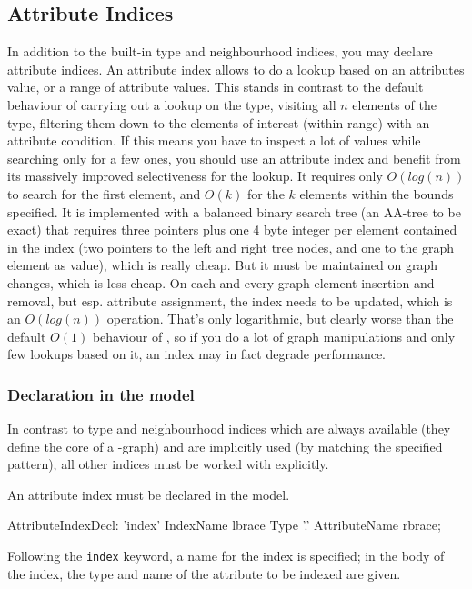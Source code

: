 \subsection{Attribute Indices}
In addition to the built-in type and neighbourhood indices, you may declare attribute indices.
An attribute index allows to do a lookup based on an attributes value, or a range of attribute values.
This stands in contrast to the default behaviour of carrying out a lookup on the type, visiting all $n$ elements of the type, filtering them down to the elements of interest (within range) with an attribute condition.
If this means you have to inspect a lot of values while searching only for a few ones, you should use an attribute index and benefit from its massively improved selectiveness for the lookup.
It requires only $O(log(n))$ to search for the first element, and $O(k)$ for the $k$ elements within the bounds specified.
It is implemented with a balanced binary search tree (an AA-tree\cite{Andersson93balancedsearch} to be exact) that requires three pointers plus one 4 byte integer per element contained in the index (two pointers to the left and right tree nodes, and one to the graph element as value), which is really cheap.
But it must be maintained on graph changes, which is less cheap.
On each and every graph element insertion and removal, but esp. attribute assignment, the index needs to be updated, which is an $O(log(n))$ operation.
That's only logarithmic, but clearly worse than the default $O(1)$ behaviour of \GrG{}, so if you do a lot of graph manipulations and only few lookups based on it, an index may in fact degrade performance.

\subsubsection*{Declaration in the model}
In contrast to type and neighbourhood indices which are always available (they define the core of a \GrG{}-graph) and are implicitly used (by matching the specified pattern), all other indices must be worked with explicitly.

An attribute index must be declared in the model.

\begin{rail}
  AttributeIndexDecl: 'index' IndexName lbrace Type '.' AttributeName rbrace;
\end{rail}

Following the \texttt{index} keyword, a name for the index is specified; in the body of the index, the type and name of the attribute to be indexed are given.

